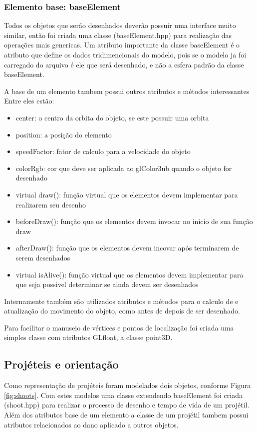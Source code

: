 \documentclass{article}
\begin{document}
\subsubsection{Elemento base: baseElement}

Todos os objetos que serão desenhados deverão possuir uma interface muito similar, então foi criada uma classe (baseElement.hpp) para realização das operações mais genericas. Um atributo importante da classe baseElement é o atributo que define os dados tridimencionais do modelo, pois se o modelo ja foi carregado do arquivo é ele que será desenhado, e não a esfera padrão da classe baseElement.

A base de um elemento tambem possui outros atributos e métodos interessantes Entre eles estão:

\begin{itemize}
	\item center: o centro da orbita do objeto, se este possuir uma orbita
	\item position: a posição do elemento
	\item speedFactor: fator de calculo para a velocidade do objeto
	\item colorRgb: cor que deve ser aplicada ao glColor3ub quando o objeto for desenhado
	\item virtual draw(): função virtual que os elementos devem implementar para realizarem seu desenho
	\item beforeDraw(): função que os elementos devem invocar no inicio de sua função draw
	\item afterDraw(): função que os elementos devem incovar após terminarem de serem desenhados
	\item virtual isAlive(): função virtual que os elementos devem implementar para que seja possivel determinar se ainda devem ser desenhados
\end{itemize}

Internamente também são utilizados atributos e métodos para o calculo de e atualização do movimento do objeto, como antes de depois de ser desenhado.

Para facilitar o manuseio de vértices e pontos de localização foi criada uma simples classe com atributos GLfloat, a classe point3D.

\subsection{Projéteis e orientação}

Como representação de projéteis foram modelados dois objetos, conforme Figura \ref{fig:shoots}. Com estes modelos uma classe extendendo baseElement foi criada (shoot.hpp) para realizar o processo de desenho e tempo de vida de um projétil. Além dos atributos base de um elemento a classe de um projétil tambem possui atributos relacionados ao dano aplicado a outros objetos.
\end{document}
